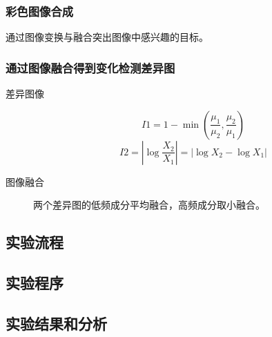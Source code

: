 \subsubsection{彩色图像合成}
通过图像变换与融合突出图像中感兴趣的目标。
\subsubsection{通过图像融合得到变化检测差异图}
\begin{description}
	\item[差异图像] 
	\[ I1=1-\min \left( \frac{\mu_1}{\mu_2},\frac{\mu_2}{\mu_1} \right)  \]
	\[ I2= \left| \log\frac{X_2}{X_1} \right| = \left| \log X_2 - \log X_1 \right|  \]
	\item[图像融合]
	两个差异图的低频成分平均融合，高频成分取小融合。
\end{description}
\subsection{实验流程}
\subsection{实验程序}
\subsection{实验结果和分析}